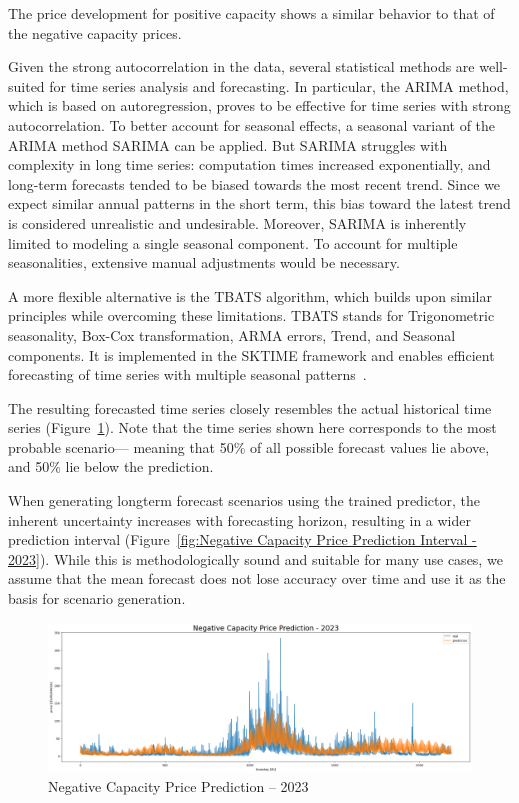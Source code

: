 The price development for positive capacity shows a similar behavior
to that of the negative capacity prices.

Given the strong autocorrelation in the data, several statistical methods are well-suited
for time series analysis and forecasting. In particular, the ARIMA method,
which is based on autoregression, proves to be effective for time series
with strong autocorrelation. To better account for seasonal effects,
a seasonal variant of the ARIMA method SARIMA can be applied.
But SARIMA struggles with complexity in long time series:
computation times increased exponentially, and long-term forecasts tended to be biased
towards the most recent trend.
Since we expect similar annual patterns in the short term, this bias toward the latest trend
is considered unrealistic and undesirable.
Moreover, SARIMA is inherently limited to modeling a single seasonal component.
To account for multiple seasonalities, extensive manual adjustments would be necessary.

A more flexible alternative is the TBATS algorithm, which builds upon similar principles
while overcoming these limitations. TBATS stands for Trigonometric seasonality,
Box-Cox transformation, ARMA errors, Trend, and Seasonal components.
It is implemented in the SKTIME framework and enables efficient forecasting
of time series with multiple seasonal patterns~\cite{.05.04.2025}.

The resulting forecasted time series closely resembles the actual historical time series
(Figure~\ref{fig:Negative Capacity Price Prediction - 2023}).
Note that the time series shown here corresponds to the most probable scenario—
meaning that 50\% of all possible forecast values lie above, and 50\% lie below the prediction.

When generating longterm forecast scenarios using the trained predictor,
the inherent uncertainty increases with forecasting horizon,
resulting in a wider prediction interval
(Figure~\ref{fig:Negative Capacity Price Prediction Interval - 2023}).
While this is methodologically sound and suitable for many use cases,
we assume that the mean forecast does not lose accuracy over time
and use it as the basis for scenario generation.

\begin{figure}[!h]
	\includegraphics[width=1\linewidth]{pictures/RL/Negative Capacity Price Prediction - 2023.png}
	\caption{Negative Capacity Price Prediction – 2023}
	\label{fig:Negative Capacity Price Prediction - 2023}
\end{figure}

